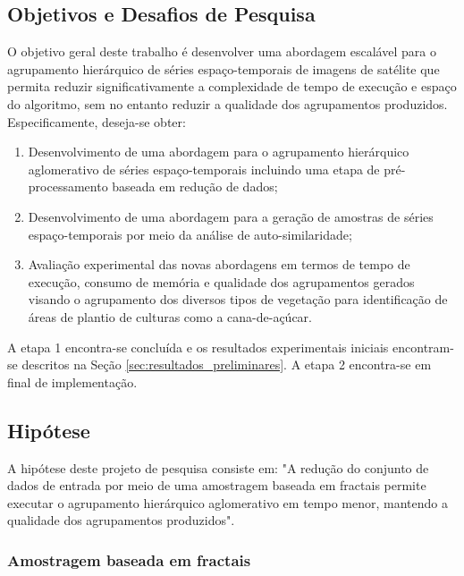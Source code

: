 \subsection{Objetivos e Desafios de Pesquisa}
	\label{subsec:objetivos}

O objetivo geral deste trabalho é desenvolver uma abordagem escalável para o
agrupamento hierárquico de séries espaço-temporais de imagens de satélite que
permita reduzir significativamente a complexidade de tempo de execução e espaço
do algoritmo, sem no entanto reduzir a qualidade dos agrupamentos produzidos.
Especificamente, deseja-se obter:

\begin{enumerate}
    \item Desenvolvimento de uma abordagem para o agrupamento hierárquico
		aglomerativo de séries espaço-temporais incluindo uma etapa de
		pré-processamento baseada em redução de dados;

    \item Desenvolvimento de uma abordagem para a geração de amostras de séries
		espaço-temporais por meio da análise de auto-similaridade;	
    
    \item Avaliação experimental das novas abordagens em termos de tempo de
		execução, consumo de memória e qualidade dos agrupamentos gerados visando o
		agrupamento dos diversos tipos de vegetação para identificação de áreas de
		plantio de culturas como a cana-de-açúcar.
\end{enumerate}

A etapa 1 encontra-se concluída e os resultados experimentais iniciais
encontram-se descritos na Seção \ref{sec:resultados_preliminares}. A
 etapa 2 encontra-se em final de implementação.
	
\subsection{Hipótese}
	\label{subsec:hipotese}

A hipótese deste projeto de pesquisa consiste em: "A redução do conjunto de
dados de entrada por meio de uma amostragem baseada em fractais permite executar o agrupamento hierárquico aglomerativo em
tempo menor, mantendo a qualidade dos agrupamentos produzidos".

\subsubsection{Amostragem baseada em fractais}

